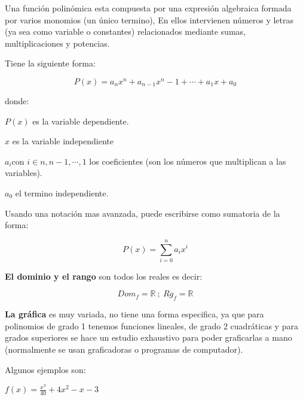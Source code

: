     Una función polinómica esta compuesta por una expresión algebraica formada por
    varios monomios (un único termino), En ellos intervienen números y letras
    (ya sea como variable o constantes)
    relacionados mediante sumas, multiplicaciones y potencias.

    Tiene la siguiente forma:

    $$ P(x) = a_nx^n+ a_{n-1}x^n-1+\cdots+ a_1x+a_0 $$

    donde:

    $ P(x) $  es la variable dependiente.

    $x$ es la variable independiente

    $ a_i $con $ i\in {n,n-1,\cdots,1} $  los coeficientes (son los números que
    multiplican a las variables).

    $ a_0 $  el termino independiente.

    Usando una notación mas avanzada, puede escribirse como sumatoria de la forma:


    $$ P(x)= \sum_{i=0}^{n}a_ix^i  $$


    \textbf{El dominio y el rango} son todos los reales es decir:

    $$ Dom_f={\mathbb{R}}\ ;\ Rg_f={\mathbb{R}} $$

    \textbf{La gráfica} es muy variada, no tiene una forma especifica, ya que
    para polinomios de grado 1 tenemos funciones lineales, de grado 2 cuadráticas
    y para grados superiores se hace un estudio exhaustivo para poder graficarlas
    a mano (normalmente se usan graficadoras o programas de computador).

    Algunos ejemplos son:

    $ f(x)= \frac{x^3}{40}+4x^2-x-3 $



